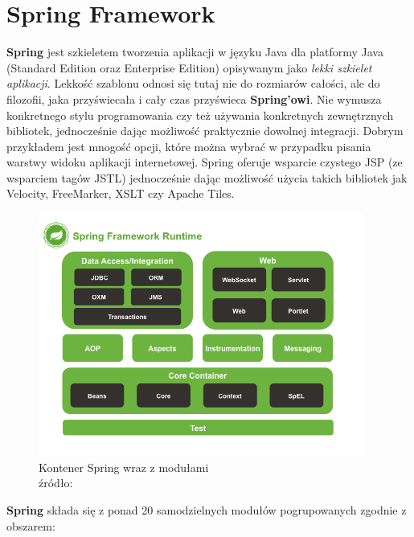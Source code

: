 \section{Spring Framework}
	\textbf{Spring} jest szkieletem tworzenia aplikacji w języku Java dla platformy Java (Standard Edition oraz Enterprise Edition) opisywanym jako \textit{lekki szkielet aplikacji}. Lekkość szablonu odnosi się tutaj nie do rozmiarów całości, ale do filozofii, jaka przyświecała i cały czas przyświeca \textbf{Spring'owi}. Nie wymusza konkretnego stylu programowania czy też używania konkretnych zewnętrznych bibliotek, jednocześnie dając możliwość praktycznie dowolnej integracji. Dobrym przykładem jest mnogość opcji, które można wybrać w przypadku pisania warstwy widoku aplikacji internetowej. Spring oferuje wsparcie czystego JSP (ze wsparciem tagów JSTL) jednocześnie dając możliwość użycia takich bibliotek jak Velocity, FreeMarker, XSLT czy Apache Tiles.
	\begin{figure}[h]
		\centering
		\includegraphics[width=0.95\textwidth]{images/spring-overview}
		\caption[Kontener Spring]{
			Kontener Spring wraz z modułami\\ 
			źródło: \cite{spring_documentation_reference}
		}
		\label{c3:information_level_figure}
	\end{figure}	
	 \textbf{Spring} składa się z ponad 20 samodzielnych modułów pogrupowanych zgodnie z obszarem:
